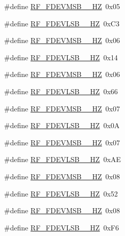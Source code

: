 \begin{DoxyCompactItemize}
\item 
\#define \mbox{\hyperlink{sx1276_regs-_fsk_8h_a61741067e7b6adeb71872ead6d569729}{R\+F\+\_\+\+F\+D\+E\+V\+M\+S\+B\+\_\+\_\+\+HZ}}~0x05
\item 
\#define \mbox{\hyperlink{sx1276_regs-_fsk_8h_a7b621f874a4cde1cff39524f75238242}{R\+F\+\_\+\+F\+D\+E\+V\+L\+S\+B\+\_\+\_\+\+HZ}}~0x\+C3
\item 
\#define \mbox{\hyperlink{sx1276_regs-_fsk_8h_aac385ea95089fd15f02ee9c6ae3f544b}{R\+F\+\_\+\+F\+D\+E\+V\+M\+S\+B\+\_\+\_\+\+HZ}}~0x06
\item 
\#define \mbox{\hyperlink{sx1276_regs-_fsk_8h_a4a3332dcc3410ea042aefd3ea508747c}{R\+F\+\_\+\+F\+D\+E\+V\+L\+S\+B\+\_\+\_\+\+HZ}}~0x14
\item 
\#define \mbox{\hyperlink{sx1276_regs-_fsk_8h_a7f10de16347c046343a2290d5b4b9746}{R\+F\+\_\+\+F\+D\+E\+V\+M\+S\+B\+\_\+\_\+\+HZ}}~0x06
\item 
\#define \mbox{\hyperlink{sx1276_regs-_fsk_8h_ad5473d95050cf0c240839957bf60cec6}{R\+F\+\_\+\+F\+D\+E\+V\+L\+S\+B\+\_\+\_\+\+HZ}}~0x66
\item 
\#define \mbox{\hyperlink{sx1276_regs-_fsk_8h_a12c35c728c8d629f7295578c715b79a8}{R\+F\+\_\+\+F\+D\+E\+V\+M\+S\+B\+\_\+\_\+\+HZ}}~0x07
\item 
\#define \mbox{\hyperlink{sx1276_regs-_fsk_8h_a4eba5e680962adb0864eb8635768fdc6}{R\+F\+\_\+\+F\+D\+E\+V\+L\+S\+B\+\_\+\_\+\+HZ}}~0x0A
\item 
\#define \mbox{\hyperlink{sx1276_regs-_fsk_8h_a37ae271366c80441c6d8c2f1e35ea29c}{R\+F\+\_\+\+F\+D\+E\+V\+M\+S\+B\+\_\+\_\+\+HZ}}~0x07
\item 
\#define \mbox{\hyperlink{sx1276_regs-_fsk_8h_ab5e21d861dfe48c74e13672bfaa53fe1}{R\+F\+\_\+\+F\+D\+E\+V\+L\+S\+B\+\_\+\_\+\+HZ}}~0x\+AE
\item 
\#define \mbox{\hyperlink{sx1276_regs-_fsk_8h_a63df078ca72c89cfb75b17b10c3b945a}{R\+F\+\_\+\+F\+D\+E\+V\+M\+S\+B\+\_\+\_\+\+HZ}}~0x08
\item 
\#define \mbox{\hyperlink{sx1276_regs-_fsk_8h_aa2e0e0c7fe24f55eb301861dcfc3a424}{R\+F\+\_\+\+F\+D\+E\+V\+L\+S\+B\+\_\+\_\+\+HZ}}~0x52
\item 
\#define \mbox{\hyperlink{sx1276_regs-_fsk_8h_a110048d122625ad47fb9d89e148dc5d2}{R\+F\+\_\+\+F\+D\+E\+V\+M\+S\+B\+\_\+\_\+\+HZ}}~0x08
\item 
\#define \mbox{\hyperlink{sx1276_regs-_fsk_8h_a080114dabe30fe534828104407a2722c}{R\+F\+\_\+\+F\+D\+E\+V\+L\+S\+B\+\_\+\_\+\+HZ}}~0x\+F6

\end{DoxyCompactItemize}
